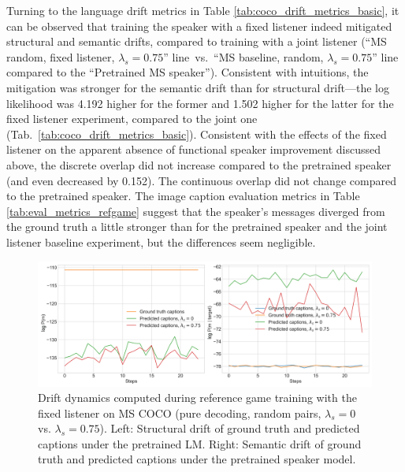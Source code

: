 Turning to the language drift metrics in Table \ref{tab:coco_drift_metrics_basic}, it can be observed that training the speaker with a fixed listener indeed mitigated structural and semantic drifts, compared to training with a joint listener (``MS random, fixed listener, $\lambda_s=0.75$'' line~vs.~``MS baseline, random, $\lambda_s=0.75$'' line compared to the ``Pretrained MS speaker''). Consistent with intuitions, the mitigation was stronger for the semantic drift than for structural drift---the log likelihood was 4.192 higher for the former and 1.502 higher for the latter for the fixed listener experiment, compared to the joint one (Tab.~\ref{tab:coco_drift_metrics_basic}). Consistent with the effects of the fixed listener on the apparent absence of functional speaker improvement discussed above, the discrete overlap did not increase compared to the pretrained speaker (and even decreased by 0.152). The continuous overlap did not change compared to the pretrained speaker. The image caption evaluation metrics in Table \ref{tab:eval_metrics_refgame} suggest that the speaker's messages diverged from the ground truth a little stronger than for the pretrained speaker and the joint listener baseline experiment, but the differences seem negligible.%
\begin{figure}[h]
	\centering
	\includegraphics[width=\linewidth]{images/coco_fixedListener_structural_semantic_drift_4000_pure_0_075_random.png}
	\caption{Drift dynamics computed during reference game training with the fixed listener on MS COCO (pure decoding, random pairs, $\lambda_s=0$ vs. $\lambda_s=0.75$). Left: Structural drift of ground truth and predicted captions under the pretrained LM. Right: Semantic drift of ground truth and predicted captions under the pretrained speaker model.}
	\label{fig:coco_fixed_listener_075_str_sem_drift}
\end{figure}

